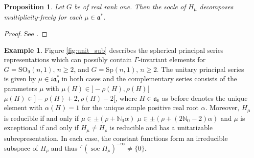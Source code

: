 \documentclass[JEP,XML,SOM,NoFloatCountersInSection,Unicode,published]{cedram}
\newcommand{\Ga}{{}^\Gamma\!}
\newtheorem{proposition}[theorem]{Proposition}
\theoremstyle{definition}
\newtheorem{example}[theorem]{Example}
\newcommand{\mf}[1]{\ensuremath{\mathfrak{#1}}}
\newcommand{\on}[1]{\ensuremath{\operatorname{#1}}}
\newcommand{\rhoa}{\ensuremath{\rho}}
\newcommand{\N}{\ensuremath{\mathbb{N}}}
\newcommand{\ps}[2]{\ensuremath{H_{#2}}}
\newcommand{\pst}[1]{\ensuremath{H_{#1}}}
\newcommand{\GSO}[1]{\ensuremath{\mathrm{SO}_0(#1,1)}}
\newcommand{\GSp}[1]{\ensuremath{\mathrm{Sp}(#1,1)}}
\begin{document}
\begin{proposition}\label{prop:soc_multone_rank_one}
Let $G$ be of real rank one. Then the socle of $\ps{\sigma}{\mu}$ decomposes multiplicity-freely for each $\mu\in\mf a^*$.
\end{proposition}

\begin{proof}
See \cite[Th.\,(6.1.3)]{C85}.
\end{proof}

\begin{example}
Figure \ref{fig:unit_sub} describes the spherical principal series representations which can possibly contain $\Gamma$-invariant elements for $G=\GSO{n}$, $n\geq 2$, and $G=\GSp{n}$, $n\geq 2$. The unitary principal series is given by $\mu\in i\mf a_0^*$ in both cases and the complementary series consists of the parameters $\mu$ with $\mu(H)\in{}]-\rhoa(H),\rhoa(H)[$ \resp $\mu(H)\in{}]-\rhoa(H)+2,\rhoa(H)-2[$, where $H\in\mf a_0$ as before denotes the unique ele\-ment with $\alpha(H)=1$ for the unique simple positive real root $\alpha$. Moreover, $\pst{\mu}$ is reducible if and only if $\mu\in\pm(\rhoa+\N_0\alpha)$ \resp $\mu\in\pm(\rhoa+(2\N_0-2)\alpha)$ and $\mu$ is exceptional if and only if $\pst{\mu}\neq\pst{\rho}$ is reducible and has a unitarizable subrepresentation. In each case, the constant functions form an irreducible subspace of $\pst{\rhoa}$ and thus $\Ga(\on{soc}\pst{\rhoa})^{-\infty}\neq\{0\}$.
\end{example}
\end{document}
